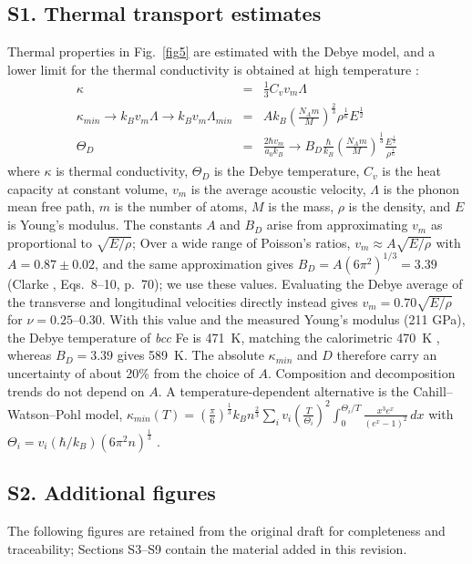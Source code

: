 \documentclass[final,3p,times]{elsarticle}
\begin{document}
\subsection*{S1. Thermal transport estimates}

Thermal properties in Fig.~\ref{fig5} are estimated with the Debye model, and a lower limit for the thermal conductivity is obtained at high temperature \cite{clarke2003materialsselection,clarke2003materialsdesign}:
\begin{eqnarray}
    \kappa &=& \frac{1}{3} C_v v_m \Lambda \\
    \kappa_{min} \rightarrow k_B v_m \Lambda \rightarrow k_B v_m \Lambda_{min} &=& A k_B \left(\frac{N_A m}{M}\right)^{\frac{2}{3}} \rho^{\frac{1}{6}} E^{\frac{1}{2}} \\
    \Theta_D &=& \frac{2\hbar v_m}{a_0 k_B} \rightarrow B_D \frac{\hbar}{k_B} \left(\frac{N_A m}{M}\right)^{\frac{1}{3}} \frac{E^{\frac{1}{2}} }{\rho^{\frac{1}{6}}}
\end{eqnarray}
where $\kappa$ is thermal conductivity, $\Theta_D$ is the Debye temperature, $C_v$ is the heat capacity at constant volume, $v_m$ is the average acoustic velocity, $\Lambda$ is the phonon mean free path, $m$ is the number of atoms, $M$ is the mass, $\rho$ is the density, and $E$ is Young's modulus. The constants $A$ and $B_D$ arise from approximating $v_m$ as proportional to $\sqrt{E/\rho}$; Over a wide range of Poisson's ratios, $v_m\approx A\sqrt{E/\rho}$ with $A=0.87\pm0.02$, and the same approximation gives $B_D=A(6\pi^2)^{1/3}=3.39$ (Clarke \cite{clarke2003materialsselection}, Eqs.~8--10, p.~70); we use these values. Evaluating the Debye average of the transverse and longitudinal velocities directly instead gives $v_m=0.70\sqrt{E/\rho}$ for $\nu=0.25$--0.30. With this value and the measured Young's modulus (211 GPa), the Debye temperature of \textit{bcc} Fe is 471~K, matching the calorimetric 470~K \cite{kittel2005introduction}, whereas $B_D=3.39$ gives 589~K. The absolute $\kappa_{min}$ and $D$ therefore carry an uncertainty of about 20\% from the choice of $A$. Composition and decomposition trends do not depend on $A$. A temperature-dependent alternative is the Cahill--Watson--Pohl model, $\kappa_{min} (T) = (\frac{\pi}{6})^{\frac{1}{3}} k_B n^{\frac{2}{3}} \sum_{i} v_i (\frac{T}{\Theta_i})^2 \int_{0}^{\Theta_i/T} \frac{x^3 e^x}{(e^x -1)^2}\,dx$ with $\Theta_i = v_i (\hbar/k_B) (6\pi^2n)^{\frac{1}{3}}$ \cite{cahill1992lower}.

\subsection*{S2. Additional figures}
The following figures are retained from the original draft for completeness and traceability; Sections S3--S9 contain the material added in this revision.
\end{document}
